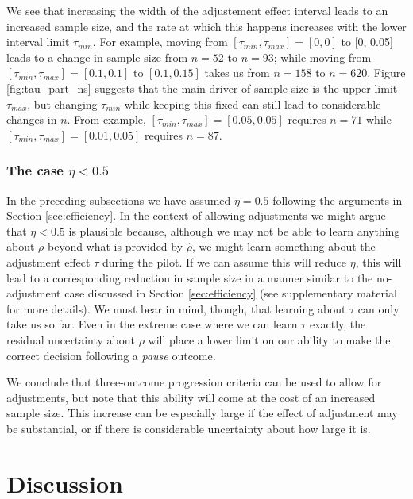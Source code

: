\documentclass{bmcart}
\begin{document}
We see that increasing the width of the adjustement effect interval leads to an increased sample size, and the rate at which this happens increases with the lower interval limit $\tau_{min}$. For example, moving from $[\tau_{min}, \tau_{max}] = [0, 0]$ to [0, 0.05] leads to a change in sample size from $n = 52$ to $n = 93$; while moving from   $[\tau_{min}, \tau_{max}] = [0.1, 0.1]$ to $[0.1, 0.15]$ takes us from $n = 158$ to $n = 620$. Figure \ref{fig:tau_part_ns} suggests that the main driver of sample size is the upper limit $\tau_{max}$, but changing $\tau_{min}$ while keeping this fixed can still lead to considerable changes in $n$. From example, $[\tau_{min}, \tau_{max}] = [0.05, 0.05]$ requires $n = 71$ while $[\tau_{min}, \tau_{max}] = [0.01, 0.05]$ requires $n = 87$.

\subsubsection{The case $\eta < 0.5$}

In the preceding subsections we have assumed $\eta = 0.5$ following the arguments in Section \ref{sec:efficiency}. In the context of allowing adjustments we might argue that $\eta < 0.5$ is plausible because, although we may not be able to learn anything about $\rho$ beyond what is provided by $\hat{\rho}$, we might learn something about the adjustment effect $\tau$ during the pilot. If we can assume this will reduce $\eta$, this will lead to a corresponding reduction in sample size in a manner similar to the no-adjustment case discussed in Section \ref{sec:efficiency} (see supplementary material for more details). We must bear in mind, though, that learning about $\tau$ can only take us so far. Even in the extreme case where we can learn $\tau$ exactly, the residual uncertainty about $\rho$ will place a lower limit on our ability to make the correct decision following a \emph{pause} outcome.

We conclude that three-outcome progression criteria can be used to allow for adjustments, but note that this ability will come at the cost of an increased sample size. This increase can be especially large if the effect of adjustment may be substantial, or if there is considerable uncertainty about how large it is.

\section{Discussion}\label{sec:discussion}
\end{document}
